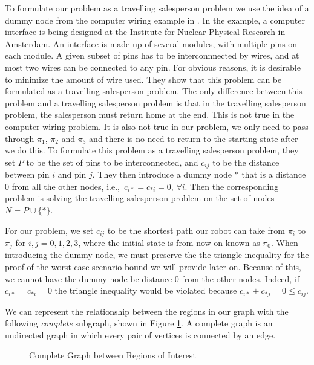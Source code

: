 To formulate our problem as a travelling salesperson problem we use the idea of a dummy node from the computer wiring example in \cite{lenstra75}. In the example, a computer interface is being designed at the Institute for Nuclear Physical Research in Amsterdam. An interface is made up of several modules, with multiple pins on each module. A given subset of pins has to be interconnnected by wires, and at most two wires can be connected to any pin. For obvious reasons, it is desirable to minimize the amount of wire used. They show that this problem can be formulated as a travelling salesperson problem. The only difference between this problem and a travelling salesperson problem is that in the travelling salesperson problem, the salesperson must return home at the end. This is not true in the computer wiring problem. It is also not true in our problem, we only need to pass through $\pi_1$, $\pi_2$ and $\pi_3$ and there is no need to return to the starting state after we do this. To formulate this problem as a travelling salesperson problem, they set $P$ to be the set of pins to be interconnected, and $c_{ij}$ to be the distance between pin $i$ and pin $j$. They then introduce a dummy node $*$ that is a distance 0 from all the other nodes, i.e.,\ $c_{i*} = c_{*i} = 0$, $\forall i$. Then the corresponding problem is solving the travelling salesperson problem on the set of nodes $N=P \cup \{*\}$. 

For our problem, we set $c_{ij}$ to be the shortest path our robot can take from $\pi_i$ to $\pi_j$ for $i,j=0,1,2,3$, where the initial state is from now on known as $\pi_0$. When introducing the dummy node, we must preserve the the triangle inequality for the proof of the worst case scenario bound we will provide later on. Because of this, we cannot have the dummy node be distance 0 from the other nodes. Indeed, if $c_{i*} = c_{*i} = 0 $ the triangle inequality would be violated because $c_{i*} + c_{*j} = 0 \leq c_{ij}$.

We can represent the relationship between the regions in our graph with the following \textit{complete} subgraph, shown in Figure \ref{fig:completeGraph}. A complete graph is an undirected graph in which every pair of vertices is connected by an edge. 

\begin{figure}
\centering
{}
\caption{Complete Graph between Regions of Interest}
\label{fig:completeGraph}
\end{figure}

